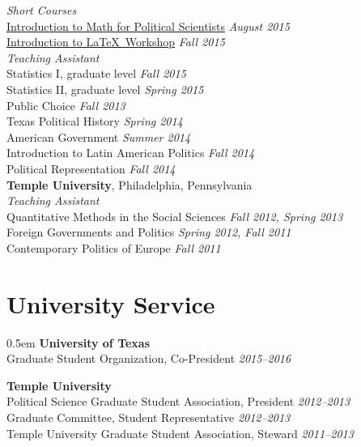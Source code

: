 \documentclass[article,11pt,oneside]{memoir}
\begin{document}
\emph{Short Courses}\\
\href{https://github.com/jabranham/math-camp}{Introduction to Math for
  Political Scientists} \hfill \emph{August
  2015}\\
\href{https://github.com/jabranham/latex-workshop}{Introduction
  to \LaTeX~Workshop} \hfill \emph{Fall 2015}\\

\emph{Teaching Assistant} \\
 Statistics I, graduate level \hfill \emph{Fall 2015}\\
 Statistics II, graduate level \hfill \emph{Spring 2015}\\
 Public Choice \hfill \emph{Fall 2013}\\
 Texas Political History \hfill \emph{Spring 2014}\\
 American Government \hfill \emph{Summer 2014}\\
 Introduction to Latin American Politics \hfill \emph{Fall 2014}\\
 Political Representation \hfill \emph{Fall 2014}\\

\textbf{Temple University}, Philadelphia, Pennsylvania \\
\emph{Teaching Assistant}\\
 Quantitative Methods in the Social Sciences \hfill \emph{Fall 2012, Spring 2013}\\
 Foreign Governments and Politics \hfill \emph{Spring 2012, Fall 2011}\\
 Contemporary Politics of Europe \hfill \emph{Fall 2011}\\

\bigskip{}

\section{University Service}{0.5em}
\textbf{University of Texas} \\
Graduate Student Organization, Co-President \hfill \emph{2015--2016} %
\medskip{}

\textbf{Temple University}\\
Political Science Graduate Student Association, President \hfill \emph{2012--2013} \\
Graduate Committee, Student Representative \hfill \emph{2012--2013} \\
Temple University Graduate Student Association, Steward \hfill \emph{2011--2013} %
\end{document}
